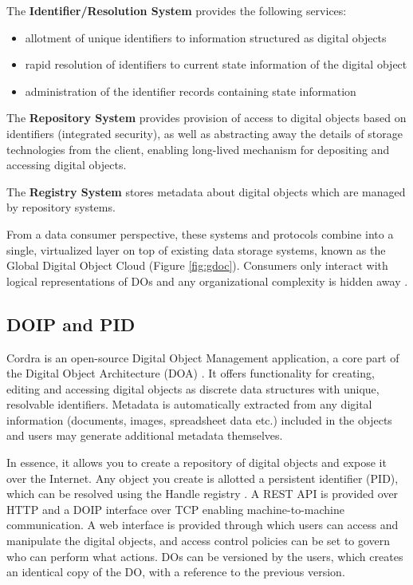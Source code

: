 \documentclass[conference]{IEEEtran}
\begin{document}
The \textbf{Identifier/Resolution System} provides the following services:
\begin{itemize}
    \item allotment of unique identifiers to information structured as digital objects
    \item rapid resolution of identifiers to current state information of the digital object
    \item administration of the identifier records containing state information
\end{itemize}

The \textbf{Repository System} provides provision of access to digital objects based on identifiers (integrated security), as well as abstracting away the details of storage technologies from the client, enabling long-lived mechanism for depositing and accessing digital objects.

The \textbf{Registry System} stores metadata about digital objects which are managed by repository systems.

From a data consumer perspective, these systems and protocols combine into a single, virtualized layer on top of existing data storage systems, known as the Global Digital Object Cloud (Figure \ref{fig:gdoc}). Consumers only interact with logical representations of DOs and any organizational complexity is hidden away \cite{wittenburg2019persistent}.

\subsection{DOIP and PID}
Cordra \cite{cordra} is an open-source Digital Object Management application, a core part of the Digital Object Architecture (DOA) \cite{sharp2016overview}. It offers functionality for creating, editing and accessing digital objects as discrete data structures with unique, resolvable identifiers. Metadata is automatically extracted from any digital information (documents, images, spreadsheet data etc.) included in the objects and users may generate additional metadata themselves.

In essence, it allows you to create a repository of digital objects and expose it over the Internet. Any object you create is allotted a persistent identifier (PID), which can be resolved using the Handle registry \cite{handle} \cite{sun2003handle}. A REST API is provided over HTTP and a DOIP \cite{dona2018digital} interface over TCP enabling machine-to-machine communication. A web interface is provided through which users can access and manipulate the digital objects, and access control policies can be set to govern who can perform what actions. DOs can be versioned by the users, which creates an identical copy of the DO, with a reference to the previous version. 
\end{document}
